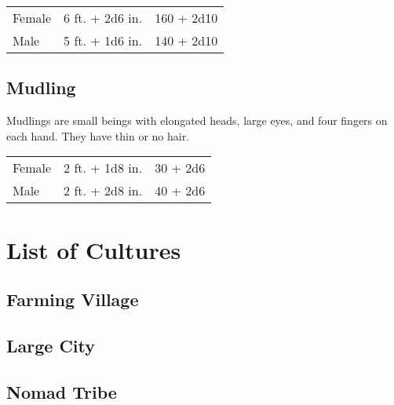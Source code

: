 \begin{multicols}{2}
\begin{center}
{
\begin{xtabular}{|l|l|l|}
Female & 6 ft. + 2d6 in. & 160 + 2d10 \\
Male & 5 ft. + 1d6 in. & 140 + 2d10 \\
\hline
\end{xtabular}
}
\end{center}

\subsection{Mudling}

Mudlings are small beings with elongated heads, large eyes, and four fingers on each hand. They
have thin or no hair.

\begin{center}
{
\begin{xtabular}{|l|l|l|}
Female & 2 ft. + 1d8 in. & 30 + 2d6 \\
Male & 2 ft. + 2d8 in. & 40 + 2d6 \\
\hline
\end{xtabular}
}
\end{center}

\section{List of Cultures}

\subsection{Farming Village}
\subsection{Large City}
\subsection{Nomad Tribe}

\end{multicols}
